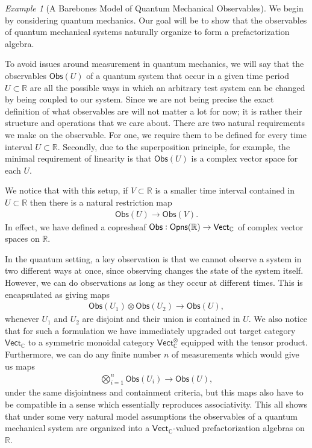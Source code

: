 \documentclass[12pt,a4paper]{article}
\newcounter{counter} \numberwithin{counter}{section}
\theoremstyle{definition}
\theoremstyle{plain}
\theoremstyle{remark}
\newtheorem{example}[counter]{Example}
\newcommand{\opens}[1][s]{%
    \ifx r#1\mathsf{Opns}\else
    \ifx s#1\mathscr{O} \mathsf{pns}\else
    \mathrm{Illegal~option}%
    \fi\fi
}
\begin{document}
\begin{example}[A Barebones Model of Quantum Mechanical Observables]\label{ex:barebones_qm}
    We begin by considering quantum mechanics. Our goal will be to show that the observables of quantum mechanical systems naturally organize to form a prefactorization algebra.

    To avoid issues around measurement in quantum mechanics, we will say that the observables $\mathsf{Obs}(U)$ of a quantum system that occur in a given time period $U \subset \mathbb{R}$ are all the possible ways in which an arbitrary test system can be changed by being coupled to our system. Since we are not being precise the exact definition of what observables are will not matter a lot for now; it is rather their structure and operations that we care about. There are two natural requirements we make on the observable. For one, we require them to be defined for every time interval $U \subset \mathbb{R}$. Secondly, due to the superposition principle, for example, the minimal requirement of linearity is that $\mathsf{Obs}(U)$ is a complex vector space for each $U$.

    We notice that with this setup, if $V \subset \mathbb{R}$ is a smaller time interval contained in $U \subset \mathbb{R}$ then there is a natural restriction map
    \begin{align}
        \mathsf{Obs} (U) \rightarrow \mathsf{Obs} (V).
    \end{align}
    In effect, we have defined a copresheaf $\mathsf{Obs}: \opens[r](\mathbb{R}) \rightarrow \mathsf{Vect}_{\mathbb{C}}$ of complex vector spaces on $\mathbb{R}$.

    In the quantum setting, a key observation is that we cannot observe a system in two different ways at once, since observing changes the state of the system itself. However, we can do observations as long as they occur at different times. This is encapsulated as giving maps
    \begin{align}
        \mathsf{Obs} (U_1) \otimes \mathsf{Obs} (U_2) \xrightarrow{\quad} \mathsf{Obs} (U),
    \end{align}
    whenever $U_1$ and $U_2$ are disjoint and their union is contained in $U$. We also notice that for such a formulation we have immediately upgraded out target category $\mathsf{Vect}_{\mathbb{C}}$ to a symmetric monoidal category $\mathsf{Vect}_{\mathbb{C}}^{\otimes}$ equipped with the tensor product. Furthermore, we can do any finite number $n$ of measurements which would give us maps
    \begin{align}
        \bigotimes_{i=1}^{n} \mathsf{Obs} (U_i) \xrightarrow{\quad} \mathsf{Obs} (U),
    \end{align}
    under the same disjointness and containment criteria, but this maps also have to be compatible in a sense which essentially reproduces associativity. This all shows that under some very natural model assumptions the observables of a quantum mechanical system are organized into a $\mathsf{Vect}_{\mathbb{C}}$-valued prefactorization algebras on $\mathbb{R}$.


\end{example}
\end{document}
